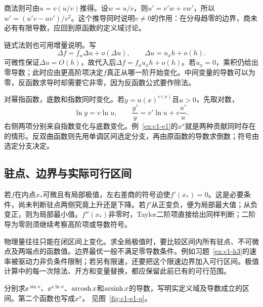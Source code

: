 商法则可由$u=v(u/v)$推得。设$w=u/v$，则$u'=v'w+vw'$，所以$w'=(u'v-uv')/v^2$。这个推导同时说明$v\ne0$的作用：在分母趋零的边界，商未必有有限导数，应回到原函数的定义域讨论。

链式法则也可用增量说明。写
\[\Delta f=f_u\Delta u+o(\Delta u),\qquad
\Delta u=u_xh+o(h).\]
可微性保证$\Delta u=O(h)$，故代入后$\Delta f=f_uu_xh+o(h)$。若$u_x=0$，乘积仍给出零导数；此时应由更高阶项决定$f$真正从哪一阶开始变化。中间变量的导数可以为零，反函数求导时却需要它非零，因为反函数公式要作除法。

对幂指函数，底数和指数同时变化。若$y=u(x)^{v(x)}$且$u>0$，先取对数，
\[\ln y=v\ln u,\qquad
\frac{y'}y=v'\ln u+v\frac{u'}u.\]
右侧两项分别来自指数变化与底数变化。例~\ref{ex:c1-e1}的$x^x$就是两种贡献同时存在的情形。反双曲函数则先用单调区间选定分支，再由原函数的导数求倒数；符号由选定分支决定。

\subsection{驻点、边界与实际可行区间}
若$f$在内点$x_*$可微且有局部极值，左右差商的符号迫使$f'(x_*)=0$。这是必要条件，尚未判断驻点两侧究竟上升还是下降。若$f'$从正变负，便为局部最大值；从负变正，则为局部最小值。$f''(x_*)$非零时，Taylor二阶项直接给出同样判断；二阶导为零则须继续考察高阶项或导数符号。

物理量往往只能在闭区间上变化。求全局极值时，要比较区间内所有驻点、不可微点及两端点的函数值。边界最优一般不满足零导数条件。例如习题~\ref{ex:c1-h3}的速率被驱动力非负条件限制；若另有限速，还要把这个限速边界加入可行区间。极值计算中的每一次除法、开方和变量替换，都应保留此前已有的可行范围。

\begin{example}[复合函数与反双曲函数]\label{ex:c1-e1}
分别求$\ee^{\sin x}$、$\ee^{x\ln x}$、$\operatorname{arcosh} x$和$\operatorname{arsinh} x$的导数，写明实定义域及导数成立的区间。第二个函数也写成$x^x$。 见图~\ref{fig:c1-e1-q}。
\end{example}

